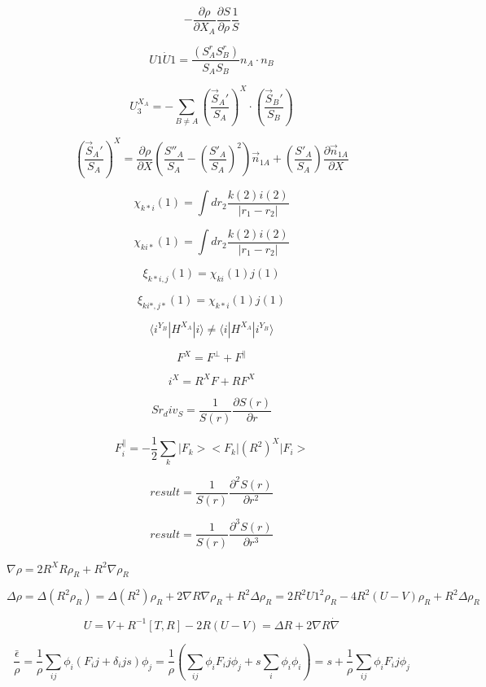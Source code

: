 \documentclass{article}
\begin{document}
\[
 -\frac{\partial \rho}{\partial X_A}\frac{\partial S}{\partial \rho}\frac{1}{S}
\]
\pagebreak

\[
 U1\dot U1 = \frac{\left(S^r_A S^r_B\right)}{S_A S_B} n_A \cdot n_B
\]
\pagebreak

\[
U_3^{X_A} = -\sum_{B\neq A}\left(\frac{\vec S_A'}{S_A}\right)^X\cdot\left(\frac{\vec S_B'}{S_B}\right)
\]
\pagebreak

\[
\left(\frac{\vec S_A'}{S_A}\right)^X =
    \frac{\partial \rho}{\partial X}\left(\frac{S''_A}{S_A}
         -\left(\frac{S'_A}{S_A}\right)^2\right)\vec n_{1A}
    + \left(\frac{S'_A}{S_A}\right)\frac{\partial \vec n_{1A}}{\partial X}
\]
\pagebreak

\[ \chi_{k{*} i}(1) = \int dr_2 \frac{k(2) i(2)}{|r_1-r_2|} \]
\pagebreak

\[ \chi_{ki{*}}(1) = \int dr_2 \frac{k(2) i(2)}{|r_1-r_2|} \]
\pagebreak

\[ \xi_{k{*}i,j}(1) = \chi_{ki}(1) j(1) \]
\pagebreak

\[ \xi_{ki{*},j{*}}(1) = \chi_{k{*}i}(1) j(1) \]
\pagebreak

\[
 \langle i^{Y_B}|H^{X_A}|i\rangle \neq \langle i|H^{X_A}|i^{Y_B}\rangle
\]
\pagebreak

\[
    F^X = F^\perp + F^\parallel
\]
\pagebreak

\[
  i^X   = R^X F + R F^X
\]
\pagebreak

\[
    Sr_div_S = \frac{1}{S(r)}\frac{\partial S(r)}{\partial r}
\]
\pagebreak

\[
 F_i^\parallel = -\frac{1}{2}\sum_k|F_k ><F_k | (R^2)^X | F_i>
\]
\pagebreak

\[
    result = \frac{1}{S(r)}\frac{\partial^2 S(r)}{\partial r^2}
\]
\pagebreak

\[
   result = \frac{1}{S(r)}\frac{\partial^3 S(r)}{\partial r^3}
\]
\pagebreak

$ \nabla\rho = 2R^X R \rho_R + R^2\nabla \rho_R $
\pagebreak

\[
  \Delta \rho = \Delta (R^2 \rho_R)
         = \Delta (R^2) \rho_R + 2\nabla R \nabla \rho_R + R^2 \Delta \rho_R
         = 2 R^2 U1^2 \rho_R -4 R^2 ( U-V ) \rho_R + R^2 \Delta\rho_R
\]
\pagebreak

\[
  U=V + R^{-1}[T,R]
  -2 R (U-V) = \Delta R + 2\nabla R\dot \nabla
\]
\pagebreak

\[
\frac{\bar \epsilon}{\rho} = \frac{1}{\rho}\sum_{ij}\phi_i(F_ij+\delta_ij s)\phi_j
       = \frac{1}{\rho} ( \sum_{ij}\phi_i F_ij \phi_j + s\sum_i\phi_i\phi_i )
       = s + \frac{1}{\rho} \sum_{ij}\phi_i F_ij \phi_j
\]
\pagebreak
\end{document}
